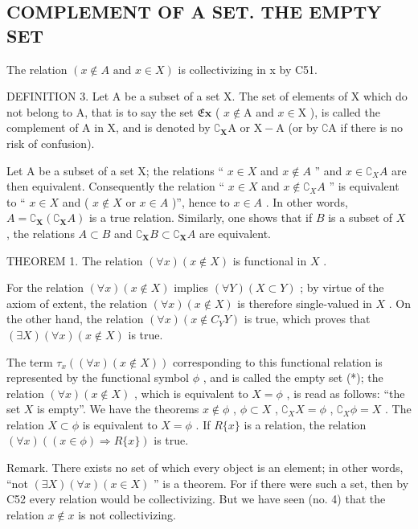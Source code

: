 \subsection{COMPLEMENT OF A SET. THE EMPTY SET}

The relation \((x \notin A \text{ and } x \in X)\) is collectivizing in x by C51.

DEFINITION 3. Let A be a subset of a set X. The set of elements of X which do not belong to A, that is to say the set \(\mathfrak{E}\mathbf{x}\) ( \(x \notin \mathrm{A}\) and \(x \in \mathrm{X}\) ), is called the complement of A in X, and is denoted by \(\complement_{\mathbf{X}}\mathrm{A}\) or \(\mathrm{X} - \mathrm{A}\) (or by \(\complement\mathrm{A}\) if there is no risk of confusion).

Let A be a subset of a set X; the relations `` \(x \in X\) and \(x \notin A\) '' and \(x \in \complement_{X} A\) are then equivalent. Consequently the relation `` \(x \in X\) and \(x \notin \complement_{X} A\) '' is equivalent to `` \(x \in X\) and ( \(x \notin X\) or \(x \in A\) )'', hence to \(x \in A\) . In other words, \(A = \complement_{\mathbf{X}}(\complement_{\mathbf{X}} A)\) is a true relation. Similarly, one shows that if \(B\) is a subset of \(X\) , the relations \(A \subset B\) and \(\complement_{\mathbf{X}} B \subset \complement_{\mathbf{X}} A\) are equivalent.

THEOREM 1. The relation \((\forall x)(x \notin X)\) is functional in \(X\) .

For the relation \((\forall x)(x \notin X)\) implies \((\forall Y)(X \subset Y)\) ; by virtue of the axiom of extent, the relation \((\forall x)(x \notin X)\) is therefore single-valued in \(X\) . On the other hand, the relation \((\forall x)(x \notin C_{Y}Y)\) is true, which proves that \((\exists X)(\forall x)(x \notin X)\) is true.

The term \(\tau_x((\forall x)(x \notin X))\) corresponding to this functional relation is represented by the functional symbol \(\phi\) , and is called the empty set (*); the relation \((\forall x)(x \notin X)\) , which is equivalent to \(X = \phi\) , is read as follows: ``the set \(X\) is empty''. We have the theorems \(x \notin \phi\) , \(\phi \subset X\) , \(\complement_X X = \phi\) , \(\complement_X \phi = X\) . The relation \(X \subset \phi\) is equivalent to \(X = \phi\) . If \(R \{x\}\) is a relation, the relation \((\forall x)((x \in \phi) \Longrightarrow R \{x\})\) is true.

Remark. There exists no set of which every object is an element; in other words, ``not \((\exists X)(\forall x)(x \in X)\) '' is a theorem. For if there were such a set, then by C52 every relation would be collectivizing. But we have seen (no. 4) that the relation \(x \notin x\) is not collectivizing.

